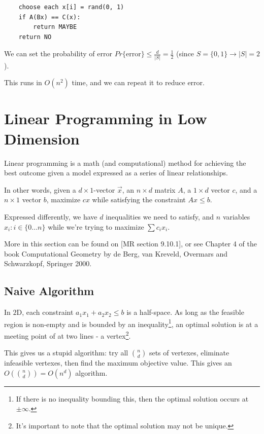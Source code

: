                 \begin{verbatim}
    choose each x[i] = rand(0, 1)
    if A(Bx) == C(x):
        return MAYBE
    return NO
                \end{verbatim}
                We can set the probability of error $Pr\{\text{error}\} \le \frac{d}{|S|} = \frac{1}{2}$ (since $S = \{0, 1\} \to |S| = 2$).

                This runs in $O(n^2)$ time, and we can repeat it to reduce error.
        \chapter{Linear Programming in Low Dimension} %
        \label{cha:linear_programming}
            Linear programming is a math (and computational) method for achieving the best outcome given a model expressed as a series of linear relationships.

            In other words, given a $d \times 1$-vector $\vec{x}$, an $n \times d$ matrix $A$, a $1 \times d$ vector $c$, and a $n \times 1$ vector $b$, maximize $cx$ while satisfying the constraint $Ax \le b$.

            Expressed differently, we have $d$ inequalities we need to satisfy, and $n$ variables $x_i : i \in \{ 0 \ldots n \}$ while we're trying to maximize $\sum c_i x_i$.

            More in this section can be found on [MR section 9.10.1], or see Chapter 4 of the book Computational Geometry by de Berg, van Kreveld, Overmars and Schwarzkopf, Springer 2000.
            \section{Naive Algorithm} %
            \label{sec:naive_algorithm}
                In $2$D, each constraint $a_1 x_1 + a_2 x_2 \le b$ is a half-space.
                As long as the feasible region is non-empty and is bounded by an inequality\footnote{If there is no inequality bounding this, then the optimal solution occurs at $\pm \infty$.}, an optimal solution is at a meeting point of at two lines - a vertex\footnote{It's important to note that the optimal solution may not be unique.}.

                This gives us a stupid algorithm:
                try all ${n \choose d}$ sets of vertexes, eliminate infeasible vertexes, then find the maximum objective value.
                This gives an $O({n \choose d}) = O(n^d)$ algorithm.

